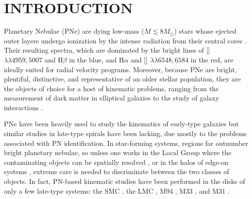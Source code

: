 \documentclass[12pt,preprint]{emulateapj}
\newcommand{\eg}{{e.g.,}}
\begin{document}

\section{INTRODUCTION}
Planetary Nebulae (PNe) are dying low-mass ($M \lesssim 8M_{\odot}$) stars whose ejected outer layers undergo ionization by the intense radiation from their central cores \citep[\eg][]{iau209}.  Their resulting spectra, which are dominated by the bright lines of [] $\lambda\lambda 4959,5007$ and H$\beta$ in the blue, and H$\alpha$ and [] $\lambda\lambda 6548,6584$ in the red, are ideally suited for radial velocity programs.  Moreover, because PNe are bright, plentiful, distinctive, and representative of an older stellar population, they are the objects of choice for a host of kinematic problems, ranging from the measurement of dark matter in elliptical galaxies \citep{PNS, deLorenzi} to the study of galaxy interactions \citep{M51, CenA}.  

PNe have been heavily used to study the kinematics of early-type galaxies \citep[][and references therein] {sw06,PNearly} but similar studies in late-type spirals have been lacking, due mostly to the problems associated with PN identification.  In star-forming systems,  regions far outnumber bright planetary nebulae, so unless one works in the Local Group where the contaminating objects can be spatially resolved \citep[\eg][]{M33,M31PNS}, or in the halos of edge-on systems \citep[\eg][]{p7,p10}, extreme care is needed to discriminate between the two classes of objects. In fact, PN-based kinematic studies have been performed in the disks of only a few late-type systems: the SMC \citep[44 objects;][]{dlfw85}, the LMC \citep[110 objects;][]{mdfw88,vmd92}, M94 \citep[67 objects;][]{M94PNS}, M33 \citep[140 objects;][]{M33}, and M31 \citep[$>$2000 objects;][]{M31PNS}.

\end{document}
